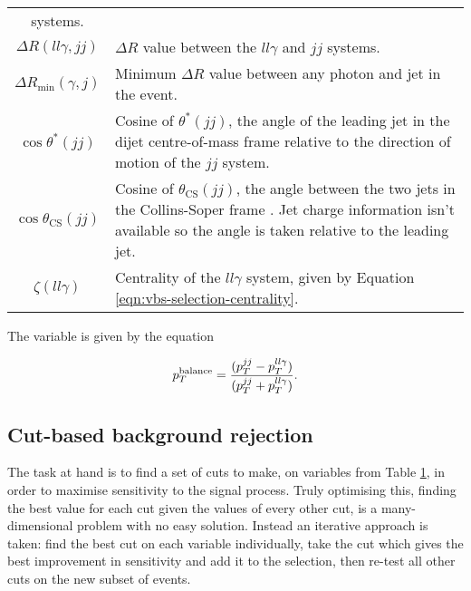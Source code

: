 \begin{table}[!p]
\begin{tabular}{c|p{10cm}}
    systems.
    \\
    $\Delta R(ll\gamma, jj)$ &
    $\Delta R$ value between the $ll\gamma$ and $jj$ systems.
    \\
    $\Delta R_\text{min}(\gamma, j)$ &
    Minimum $\Delta R$ value between any photon and jet in the event.
    \\
    $\cos{\theta^*(jj)}$ &
    Cosine of $\theta^*(jj)$, the angle of the leading jet in the dijet
    centre-of-mass frame relative to the direction of motion of the $jj$ system.
    \\
    $\cos{\theta_\text{CS}(jj)}$ &
    Cosine of $\theta_\text{CS}(jj)$, the angle between the two jets in the
    Collins-Soper frame \cite{Collins1977}. Jet charge information isn't
    available so the angle is taken relative to the leading jet.
    \\
    $\zeta(ll\gamma)$ &
    Centrality of the $ll\gamma$ system, given by Equation
    \ref{eqn:vbs-selection-centrality}.
    \\
    \hline\hline
  \end{tabular}
  \label{tab:vzy-bdt-variables}
\end{table}

The variable \ptbalance is given by the equation

\begin{equation}
  p_T^\text{balance} = \frac{ (p_T^{jj} - p_T^{ll\gamma}) }
                    { (p_T^{jj} + p_T^{ll\gamma}) }.
  \label{eqn:vzy-bdt-ptbalance}
\end{equation}

\subsection{Cut-based background rejection}

The task at hand is to find a set of cuts to make, on variables from Table
\ref{tab:vzy-bdt-variables}, in order to maximise sensitivity to the signal
process. Truly optimising this, finding the best value for each cut given the
values of every other cut, is a many-dimensional problem with no easy
solution. Instead an iterative approach is taken: find the best cut on each
variable individually, take the cut which gives the best improvement
in sensitivity and add it to the selection, then re-test all other cuts on the
new subset of events.

